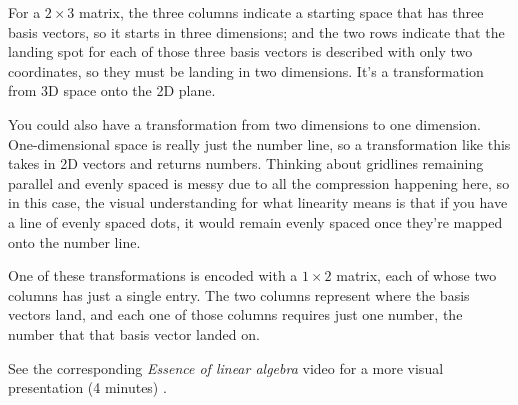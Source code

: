 For a $2 \times 3$ matrix, the three columns indicate a starting space that has
three basis vectors, so it starts in three dimensions; and the two rows indicate
that the landing spot for each of those three basis vectors is described with
only two coordinates, so they must be landing in two dimensions. It's a
transformation from 3D space onto the 2D plane.

You could also have a transformation from two dimensions to one dimension.
One-dimensional space is really just the number line, so a transformation like
this takes in 2D vectors and returns numbers. Thinking about gridlines remaining
parallel and evenly spaced is messy due to all the compression happening here,
so in this case, the visual understanding for what linearity means is that if
you have a line of evenly spaced dots, it would remain evenly spaced once
they're mapped onto the number line.

One of these transformations is encoded with a $1 \times 2$ matrix, each of
whose two columns has just a single entry. The two columns represent where the
basis vectors land, and each one of those columns requires just one number, the
number that that basis vector landed on.

\begin{remark}
  See the corresponding \textit{Essence of linear algebra} video for a more
  visual presentation (4 minutes)
  \cite{bib:linalg_nonsquare_matrices_as_transformations_between_dimensions}.
\end{remark}
